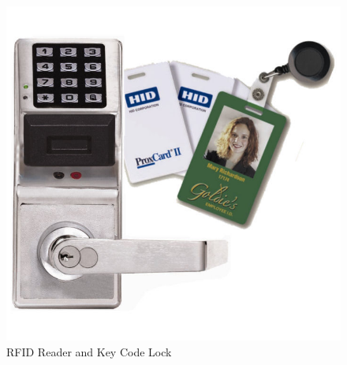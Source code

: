 \documentclass{article}
\begin{document}
\begin{figure}[H]
   \centering
       \includegraphics{figures/lock.jpg}
 \caption{RFID Reader and Key Code Lock}
 \label{fig:Lock}
\end{figure}
\end{document}
